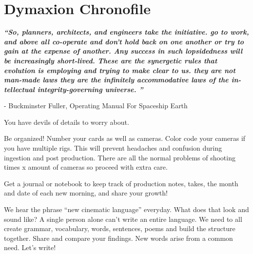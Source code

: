 \chapter{Dymaxion Chronofile}
\pagecolor{white}
\label{chap:27}
\begin{fullwidth}


{\itshape\bfseries “So, planners, architects, and engineers take the initiative. go to work, and above all co-operate and don’t hold back on one another or try to gain at the expense of another. Any success in such lopsidedness will be increasingly short-lived. These are the synergetic rules that evolution is employing and trying to make clear to us. they are not man-made laws they are the infinitely accommodative laws of the in-tellectual integrity-governing universe. ”}

- Buckminster Fuller, Operating Manual For Spaceship Earth
\vspace{\baselineskip}

\problem

{\large You have devils of details to worry about. 
 \par}

Be organized! Number your cards as well as cameras. Color code your cameras if you have multiple rigs. This will prevent headaches and confusion during ingestion and post production. There are all the normal problems of shooting times x amount of cameras so proceed with extra care. 


\solution

{\large Get a journal or notebook to keep track of production notes, takes, the month and date of each new morning, and share your growth! 

 \par}

We hear the phrase “new cinematic language” everyday. What does that look and sound like? A single person alone can’t write an entire language. We need to all create grammar, vocabulary, words, sentences, poems and build the structure together. Share and compare your findings. New words arise from a common need.  Let’s write!




\clearpage
\end{fullwidth}
